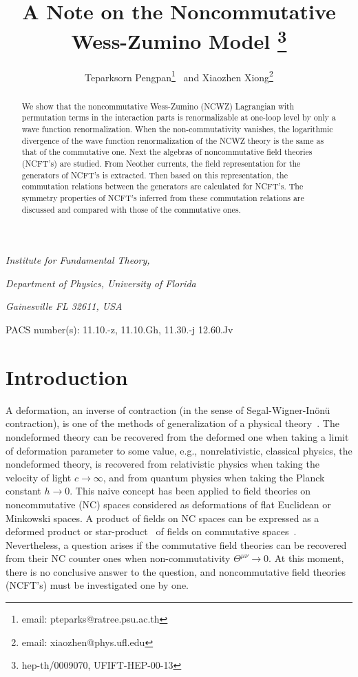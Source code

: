 \documentclass[a4paper,a4paper]{article}
\begin{document}
\title{A Note on the Noncommutative Wess-Zumino Model
\footnote{hep-th/0009070, UFIFT-HEP-00-13}}
\author{Teparksorn Pengpan\footnote{email: pteparks@ratree.psu.ac.th}~  
and Xiaozhen Xiong\footnote{email: xiaozhen@phys.ufl.edu}}
\date{}
\maketitle
\centerline{\it Institute for Fundamental Theory,}
\centerline{\it Department of Physics, University of Florida}
\centerline{\it Gainesville FL 32611, USA}
\vskip 1cm
\begin{abstract}
We show that the noncommutative Wess-Zumino (NCWZ) Lagrangian with permutation terms 
in the interaction parts is renormalizable at one-loop level by only a wave function 
renormalization. When the non-commutativity vanishes, the logarithmic divergence 
of the wave function renormalization of the NCWZ theory 
is the same as that of the commutative one. Next the algebras of noncommutative 
field theories (NCFT's) are studied. From Neother currents, the field representation 
for the generators of NCFT's is extracted. Then based on this representation, 
the commutation relations between the generators are calculated for NCFT's. 
The symmetry properties of NCFT's inferred from these commutation relations are
discussed and compared with those of the commutative ones. 
\end{abstract}
\vskip 1cm
\noindent PACS number(s): 11.10.-z, 11.10.Gh, 11.30.-j 12.60.Jv
\vskip 1cm
\section{Introduction}


A deformation, an inverse of contraction (in the sense of Segal-Wigner-In\"{o}n\"{u} 
contraction), is one of the methods of generalization of a physical theory~\cite{Bayen}. 
The nondeformed theory can be recovered from the deformed one when taking 
a limit of deformation parameter to some value, e.g., nonrelativistic, 
classical physics, the nondeformed theory, is recovered from relativistic physics 
when taking the velocity of light $c\rightarrow \infty$, and from quantum physics 
when taking the Planck constant $h \rightarrow 0$. This naive concept has been applied 
to field theories on noncommutative (NC) spaces considered as deformations of flat Euclidean 
or Minkowski spaces. A product of fields on NC spaces can be 
expressed as a deformed product or star-product~\cite{Moyal,Zac}
 of fields on commutative spaces~\cite{Filk,SW,MRS}. 
Nevertheless, a question arises if the commutative field theories can be recovered
from their NC counter ones when non-commutativity $\Theta^{\mu\nu}\rightarrow 0$. 
At this moment, there is no conclusive answer to the question, and noncommutative 
field theories (NCFT's) 
must be investigated one by one.
\end{document}
